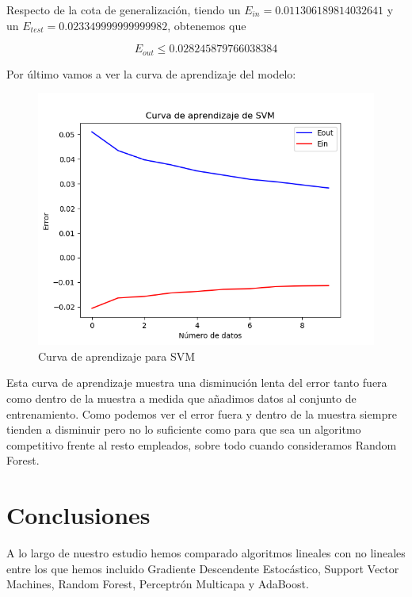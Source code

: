 Respecto de la cota de generalización, tiendo un $E_{in}= 0.011306189814032641$ y un $E_{test} = 0.023349999999999982$, obtenemos que

$$E_{out} \leq 0.028245879766038384$$

Por último vamos a ver la curva de aprendizaje del modelo:

\begin{figure}[H] %
	\centering
	\includegraphics[scale=0.6]{aprendizaje-SVM.png}  %
	\caption{Curva de aprendizaje para SVM} 
	\label{fig:aprendizaje-svm}
\end{figure}

Esta curva de aprendizaje muestra una disminución lenta del error tanto fuera como dentro de la muestra a medida que añadimos datos al conjunto de entrenamiento. Como podemos ver el error fuera y dentro de la muestra siempre tienden a disminuir pero no lo suficiente como para que sea un algoritmo competitivo frente al resto empleados, sobre todo cuando consideramos Random Forest.

\section{Conclusiones}

A lo largo de nuestro estudio hemos comparado algoritmos lineales con no lineales entre los que hemos incluido Gradiente Descendente Estocástico, Support Vector Machines, Random Forest, Perceptrón Multicapa y AdaBoost. 

